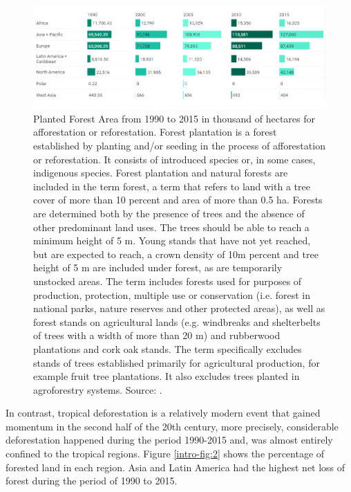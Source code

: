 \begin{figure}[htpb]
\centering
\includegraphics[width=1\linewidth]{Introduction/forestplantation.png}
\caption[Planted Forest Area from 1990 to 2015 in thousand of hectares for afforestation or reforestation ]{Planted Forest Area from 1990 to 2015 in thousand of hectares for afforestation or reforestation. Forest plantation is a forest established by planting and/or seeding in the process of afforestation or reforestation. It consists of introduced species or, in some cases, indigenous species. Forest plantation and natural forests are included in the term forest, a term that refers to land with a tree cover of more than 10 percent and area of more than 0.5 ha. Forests are determined both by the presence of trees and the absence of other predominant land uses. The trees should be able to reach a minimum height of 5 m. Young stands that have not yet reached, but are expected to reach, a crown density of 10m percent and tree height of 5 m are included under forest, as are temporarily unstocked areas. The term includes forests used for purposes of production, protection, multiple use or conservation (i.e. forest in national parks, nature reserves and other protected areas), as well as forest stands on agricultural lands (e.g. windbreaks and shelterbelts of trees with a width of more than 20 m) and rubberwood plantations and cork oak stands. The term specifically excludes stands of trees established primarily for agricultural production, for example fruit tree plantations. It also excludes trees planted in agroforestry systems. Source: \citep{unep_2018}.}
\label{intro-fig:1}
\end{figure}

In contrast, tropical deforestation is a relatively modern event that gained momentum in the second half of the 20th century, more precisely, considerable deforestation happened during the period 1990-2015 and, was almost entirely confined to the tropical regions. Figure \ref{intro-fig:2} shows the percentage of forested land in each region. Asia and Latin America had the highest net loss of forest during the period of 1990 to 2015. 

